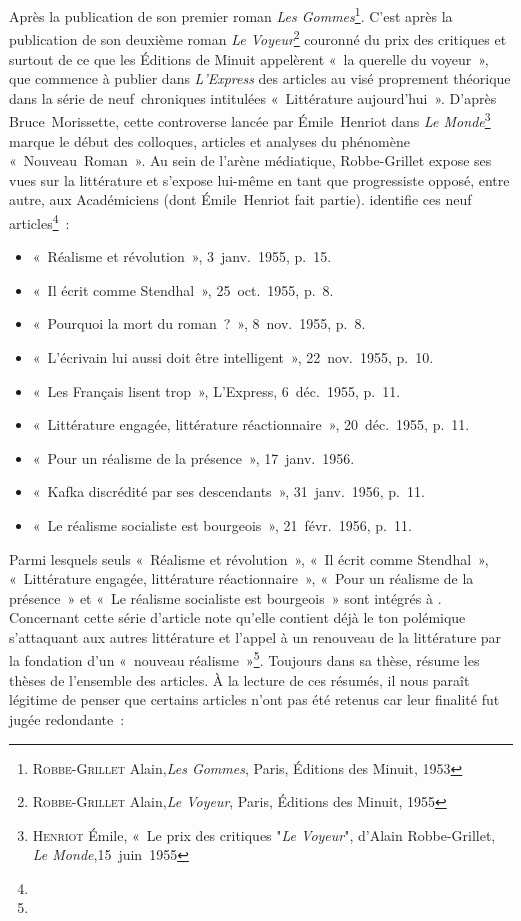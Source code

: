 \documentclass[12pt, a4paper]{article}
\begin{document}
Après la publication de son premier roman \textit{Les Gommes}\footnote{\textsc{Robbe-Grillet} Alain,\textit{Les Gommes}, Paris, Éditions des Minuit, 1953}. C'est après la publication de son deuxième roman \textit{Le Voyeur}\footnote{\textsc{Robbe-Grillet} Alain,\textit{Le Voyeur}, Paris, Éditions des Minuit, 1955} couronné du prix des critiques et surtout de ce que les Éditions de Minuit appelèrent «~la querelle du voyeur~», que \robbe{} commence à publier dans \textit{L'Express} des articles au visé proprement théorique dans la série de neuf~chroniques intitulées «~Littérature aujourd'hui~». D'après Bruce~Morissette, cette controverse lancée par Émile~Henriot dans \textit{Le Monde}\footnote{\textsc{Henriot} Émile, «~Le prix des critiques "\textit{Le Voyeur}", d'Alain Robbe-Grillet, \textit{Le Monde},15~juin~1955} marque le début des colloques, articles et analyses du phénomène «~Nouveau~Roman~». Au sein de l'arène médiatique, Robbe-Grillet expose ses vues sur la littérature et s'expose lui-même en tant que progressiste opposé, entre autre, aux Académiciens (dont Émile~Henriot fait partie). \galia{} identifie ces neuf articles\footnote{}~:
\begin{itemize}
    \item «~Réalisme et révolution~», 3~janv.~1955, p.~15.%
    \item «~Il écrit comme Stendhal~», 25~oct.~1955, p.~8.%
    \item «~Pourquoi la mort du roman~?~», 8~nov.~1955, p.~8.%
    \item «~L’écrivain lui aussi doit être intelligent~», 22~nov.~1955, p.~10.%
    \item «~Les Français lisent trop~», L’Express, 6~déc.~1955, p.~11.%
    \item «~Littérature engagée, littérature réactionnaire~», 20~déc.~1955, p.~11.%
    \item «~Pour un réalisme de la présence~», 17~janv.~1956.%
    \item «~Kafka discrédité par ses descendants~», 31~janv.~1956, p.~11.%
    \item «~Le réalisme socialiste est bourgeois~», 21~févr.~1956, p.~11.%
\end{itemize}
Parmi lesquels seuls «~Réalisme et révolution~», «~Il écrit comme Stendhal~», «~Littérature engagée, littérature réactionnaire~», «~Pour un réalisme de la présence~» et «~Le réalisme socialiste est bourgeois~» sont intégrés à \punr. Concernant cette série d'article \galia{} note qu'elle contient déjà le ton polémique s'attaquant aux autres littérature et l'appel à un renouveau de la littérature par la fondation d'un «~nouveau réalisme~»\footnote{}. Toujours dans sa thèse, \galia{} résume les thèses de l'ensemble des articles. À la lecture de ces résumés, il nous paraît légitime de penser que certains articles n'ont pas été retenus car leur finalité fut jugée redondante~:
\end{document}
